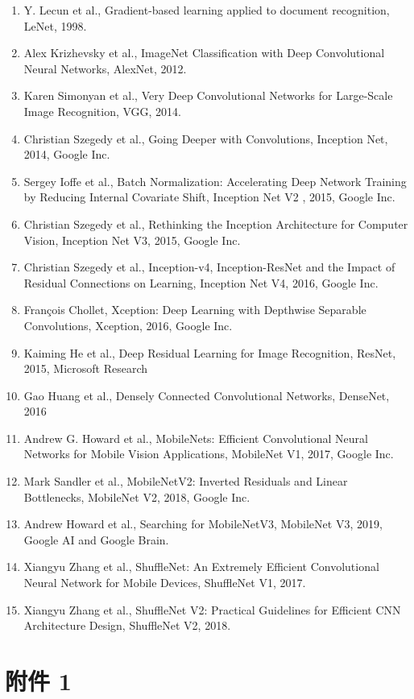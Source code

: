 \documentclass[11pt,UTF8]{ctexart}
\begin{document}
\begin{enumerate}
\item Y. Lecun et al., Gradient-based learning applied to document recognition, LeNet, 1998.
\item Alex Krizhevsky et al., ImageNet Classification with Deep Convolutional Neural Networks, AlexNet, 2012.
\item Karen Simonyan et al., Very Deep Convolutional Networks for Large-Scale Image Recognition, VGG, 2014.
\item Christian Szegedy et al., Going Deeper with Convolutions, Inception Net, 2014, Google Inc.
\item Sergey Ioffe et al., Batch Normalization: Accelerating Deep Network Training by Reducing Internal Covariate Shift, Inception Net V2 , 2015, Google Inc.
\item Christian Szegedy et al., Rethinking the Inception Architecture for Computer Vision, Inception Net V3, 2015, Google Inc.
\item Christian Szegedy et al., Inception-v4, Inception-ResNet and the Impact of Residual Connections on Learning, Inception Net V4, 2016, Google Inc.
\item François Chollet, Xception: Deep Learning with Depthwise Separable Convolutions, Xception, 2016, Google Inc.
\item Kaiming He et al., Deep Residual Learning for Image Recognition, ResNet, 2015, Microsoft Research
\item Gao Huang et al., Densely Connected Convolutional Networks, DenseNet, 2016
\item Andrew G. Howard et al., MobileNets: Efficient Convolutional Neural Networks for Mobile Vision Applications, MobileNet V1, 2017, Google Inc.
\item Mark Sandler et al., MobileNetV2: Inverted Residuals and Linear Bottlenecks, MobileNet V2, 2018, Google Inc.
\item Andrew Howard et al., Searching for MobileNetV3, MobileNet V3, 2019, Google AI and Google Brain.
\item Xiangyu Zhang et al., ShuffleNet: An Extremely Efficient Convolutional Neural Network for Mobile Devices, ShuffleNet V1, 2017. 
\item Xiangyu Zhang et al., ShuffleNet V2: Practical Guidelines for Efficient CNN Architecture Design, ShuffleNet V2, 2018.
\end{enumerate}

\newpage

\section{附件 1}
\end{document}
